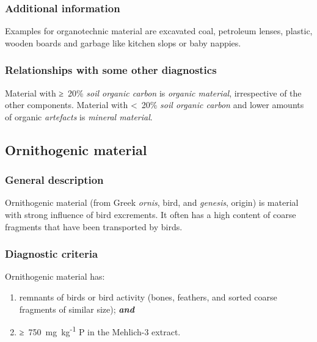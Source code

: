 \documentclass[
  letterpaper,
  DIV=11,
  numbers=noendperiod]{scrreprt}
\providecommand{\tightlist}{%
  \setlength{\itemsep}{0pt}\setlength{\parskip}{0pt}}\usepackage{longtable,booktabs,array}
\begin{document}
\hypertarget{additional-information-32}{%
\subsubsection{Additional information}\label{additional-information-32}}

Examples for organotechnic material are excavated coal, petroleum
lenses, plastic, wooden boards and garbage like kitchen slops or baby
nappies.

\hypertarget{relationships-with-some-other-diagnostics-61}{%
\subsubsection{Relationships with some other
diagnostics}\label{relationships-with-some-other-diagnostics-61}}

Material with ≥~20\% \emph{soil organic carbon} is \emph{organic
material}, irrespective of the other components. Material with
\textless~20\% \emph{soil organic carbon} and lower amounts of organic
\emph{artefacts} is \emph{mineral material}.

\hypertarget{ornithogenic-material}{%
\subsection{Ornithogenic material}\label{ornithogenic-material}}

\hypertarget{general-description-66}{%
\subsubsection{General description}\label{general-description-66}}

Ornithogenic material (from Greek \emph{ornis}, bird, and
\emph{genesis}, origin) is material with strong influence of bird
excrements. It often has a high content of coarse fragments that have
been transported by birds.

\hypertarget{diagnostic-criteria-71}{%
\subsubsection{Diagnostic criteria}\label{diagnostic-criteria-71}}

Ornithogenic material has:

\begin{enumerate}
\def\labelenumi{\arabic{enumi}.}
\tightlist
\item
  remnants of birds or bird activity (bones, feathers, and sorted coarse
  fragments of similar size); \textbf{\emph{and}}
\item
  ≥~750~mg~kg\textsuperscript{-1} P in the Mehlich-3 extract.
\end{enumerate}
\end{document}
